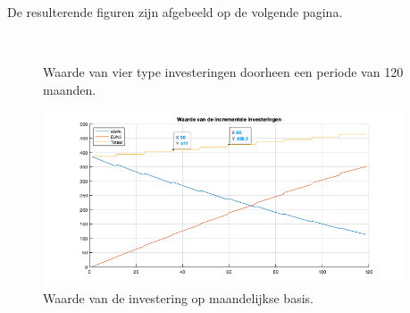 

De resulterende figuren zijn afgebeeld op de volgende pagina.

\thispagestyle{empty}

\vspace*{\fill}

\begin{figure}[h]
\centering
{}\\
\caption{Waarde van vier type investeringen doorheen een periode van 120 maanden.}%
\label{fig:op8}
\end{figure}

\begin{figure}[h]
\centering
\includegraphics[width=0.95\textwidth]{res/op9b.png}
\caption{Waarde van de investering op maandelijkse basis.}
\label{fig:op9a}
\end{figure}

